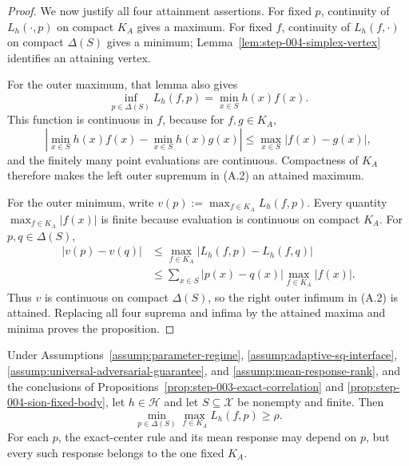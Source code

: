 \begin{proof}
We now justify all four attainment assertions.  For fixed \(p\), continuity
of \(L_h(\cdot,p)\) on compact \(K_A\) gives a maximum.  For fixed \(f\),
continuity of \(L_h(f,\cdot)\) on compact \(\Delta(S)\) gives a minimum;
Lemma~\ref{lem:step-004-simplex-vertex} identifies an attaining vertex.

For the outer maximum, that lemma also gives
\[
\inf_{p\in\Delta(S)}L_h(f,p)
=\min_{x\in S}h(x)f(x).
\]
This function is continuous in \(f\), because for \(f,g\in K_A\),
\[
\left|\min_{x\in S}h(x)f(x)-\min_{x\in S}h(x)g(x)\right|
\le\max_{x\in S}|f(x)-g(x)|,
\]
and the finitely many point evaluations are continuous.  Compactness of
\(K_A\) therefore makes the left outer supremum in (A.2) an attained maximum.

For the outer minimum, write
\(v(p):=\max_{f\in K_A}L_h(f,p)\).  Every quantity
\(\max_{f\in K_A}|f(x)|\) is finite because evaluation is continuous on
compact \(K_A\).  For \(p,q\in\Delta(S)\),
\[
\begin{aligned}
|v(p)-v(q)|
&\le\max_{f\in K_A}|L_h(f,p)-L_h(f,q)|\\
&\le\sum_{x\in S}|p(x)-q(x)|
\max_{f\in K_A}|f(x)|.
\end{aligned}
\]
Thus \(v\) is continuous on compact \(\Delta(S)\), so the right outer
infimum in (A.2) is attained.  Replacing all four suprema and infima by the
attained maxima and minima proves the proposition.
\end{proof}

\begin{proposition}
\label{prop:step-004-exact-center-lower}
Under Assumptions~\ref{assump:parameter-regime},
\ref{assump:adaptive-sq-interface},
\ref{assump:universal-adversarial-guarantee}, and
\ref{assump:mean-response-rank}, and the conclusions of
Propositions~\ref{prop:step-003-exact-correlation} and
\ref{prop:step-004-sion-fixed-body}, let \(h\in\mathcal H\) and let
\(S\subseteq\mathcal X\) be nonempty and finite.  Then
\[
\min_{p\in\Delta(S)}\max_{f\in K_A}L_h(f,p)\ge\rho.
\]
For each \(p\), the exact-center rule and its mean response may depend on
\(p\), but every such response belongs to the one fixed \(K_A\).
\end{proposition}

